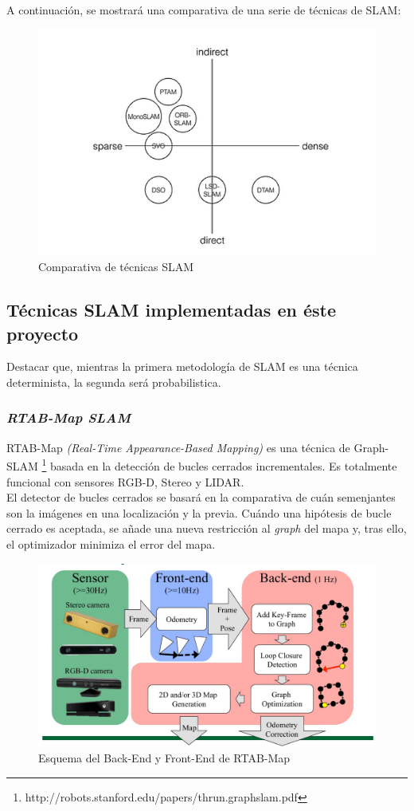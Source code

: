 \begin{itemize}
A continuación, se mostrará una comparativa de una serie de técnicas de SLAM:
\begin{figure}[h!]
    \centering
    \includegraphics[width=.6\textwidth]{images/comp_slam}
    \caption{Comparativa de técnicas SLAM}
\end{figure}

\end{itemize}

\subsection{Técnicas SLAM implementadas en éste proyecto}
Destacar que, mientras la primera metodología de SLAM es una técnica determinista, la segunda será probabilistica.
\subsubsection{\textit{RTAB-Map SLAM}}
RTAB-Map \textit{(Real-Time Appearance-Based Mapping)} es una técnica de Graph-SLAM \footnote{http://robots.stanford.edu/papers/thrun.graphslam.pdf} basada en la detección de bucles cerrados incrementales. Es totalmente funcional 
con sensores RGB-D, Stereo y LIDAR. \\
El detector de bucles cerrados se basará en la comparativa de cuán semenjantes son la imágenes en una localización y la previa. Cuándo una hipótesis 
de bucle cerrado es aceptada, se añade una nueva restricción al \textit{graph} del mapa y, tras ello, el optimizador minimiza el error del mapa. \\

\begin{figure}[h!]
    \centering
    \includegraphics[width=.7\textwidth]{images/rtabmap_scheme}
    \caption{Esquema del Back-End y Front-End de RTAB-Map}
\end{figure}


